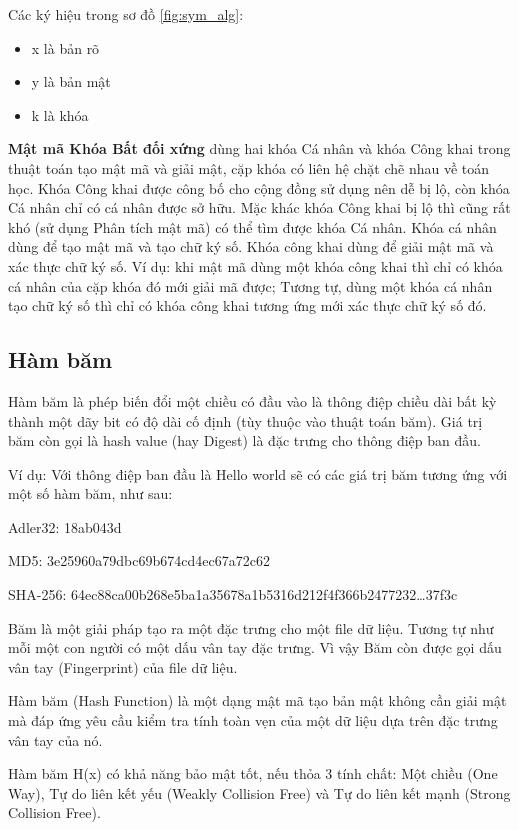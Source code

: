 Các ký hiệu trong sơ đồ \ref{fig:sym_alg}:
\begin{itemize}
\item x là bản rõ
\item y là bản mật
\item k là khóa 
\end{itemize}

\textbf{Mật mã Khóa Bất đối xứng} dùng hai khóa Cá nhân và khóa Công khai trong thuật toán tạo mật mã và giải mật, cặp khóa có liên hệ chặt chẽ nhau về toán học. Khóa Công khai được công bố cho cộng đồng sử dụng nên dễ bị lộ, còn khóa Cá nhân chỉ có cá nhân được sở hữu. Mặc khác khóa Công khai bị lộ thì cũng rất khó (sử dụng Phân tích mật mã) có thể tìm được khóa Cá nhân.
Khóa cá nhân dùng để tạo mật mã và tạo chữ ký số. Khóa công khai dùng để giải mật mã và xác thực chữ ký số. Ví dụ: khi mật mã dùng một khóa công khai thì chỉ có khóa cá nhân của cặp khóa đó mới giải mã được; Tương tự, dùng một khóa cá nhân tạo chữ ký số thì chỉ có khóa công khai tương ứng mới xác thực chữ ký số đó.

\subsection{Hàm băm}

Hàm băm là phép biến đổi một chiều có đầu vào là thông điệp chiều dài bất kỳ thành một dãy bit có độ dài cố định (tùy thuộc vào thuật toán băm). Giá trị băm còn gọi là hash value (hay Digest) là đặc trưng cho thông điệp ban đầu.

Ví dụ: Với thông điệp ban đầu là Hello world sẽ có các giá trị băm tương ứng với một số hàm băm, như sau:

Adler32: 18ab043d

MD5: 3e25960a79dbc69b674cd4ec67a72c62

SHA-256: 64ec88ca00b268e5ba1a35678a1b5316d212f4f366b2477232\ldots 37f3c

Băm là một giải pháp tạo ra một đặc trưng cho một file dữ liệu. Tương tự như mỗi một con người có một dấu vân tay đặc trưng. Vì vậy Băm còn được gọi dấu vân tay (Fingerprint) của file dữ liệu.

Hàm băm (Hash Function) là một dạng mật mã tạo bản mật không cần giải mật mà đáp ứng yêu cầu kiểm tra tính toàn vẹn của một dữ liệu dựa trên đặc trưng vân tay của nó.

Hàm băm H(x) có khả năng bảo mật tốt, nếu thỏa 3 tính chất: 
Một chiều (One Way),  Tự do liên kết yếu (Weakly Collision Free) và Tự do liên kết mạnh (Strong Collision Free).

